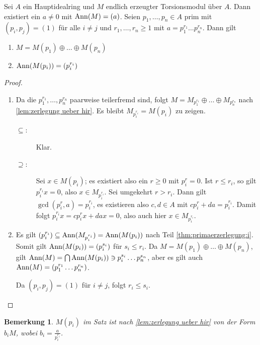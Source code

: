 \documentclass[12pt,a4paper]{scrartcl}
\theoremstyle{cplain}
\theoremstyle{cdef}
\newtheorem{beme}[thmcounter]{Bemerkung}
\begin{document}
\begin{satz} \label{thm:primaerzerlegung}
	Sei $A$ ein Hauptidealring und $M$ endlich erzeugter Torsionsmodul über $A$. Dann existiert ein $a\neq 0$ mit $\operatorname{Ann}(M) = (a)$. Seien $p_1,\dots, p_n\in A$ prim mit $(p_i, p_j) = (1)$ für alle $i\neq j$ und $r_1,\dots, r_n\ge 1$ mit $ a = p_1^{r_1}\dots p_n^{r_n} $. Dann gilt
	\begin{enumerate}
		\item $M = M(p_1)\oplus\dots\oplus M(p_n)$ \label{thm:primaerzerlegung:i}
		\item $\operatorname{Ann}(M(p_i)) = (p_i^{r_i})$ \label{thm:primaerzerlegung:ii}
	\end{enumerate}
\end{satz}
\begin{proof}
	\leavevmode
	\begin{enumerate}[label=\ref{thm:primaerzerlegung:\roman*}]
		\item Da die $p_1^{r_1},\dots, p_n^{r_n}$ paarweise teilerfremd sind, folgt $M = M_{p_1^{r_1}}\oplus\dots \oplus M_{p_n^{r_n}}$ nach \cref{lem:zerlegung ueber hir}. Es bleibt $M_{p_i^{r_i}} = M(p_i)$ zu zeigen.
		\begin{description}
			\item[\glqq$\subseteq$\grqq :] Klar.
			\item[\glqq$\supseteq$\grqq :] Sei $x\in M(p_i)$; es existiert also ein $r\ge 0$ mit $p_i^r = 0$. Ist $r \le r_i$, so gilt $p_i^{r_i}x = 0$, also $x \in M_{p_i^{r_i}}$. Sei umgekehrt $r>r_i$. Dann gilt $\gcd(p_i^r, a) = p_i^{r_i}$, es existieren also $c, d\in A$ mit $cp_i^r+da = p_i^{r_i}$. Damit folgt $p_i^{r_i}x = cp_i^rx+dax = 0$, also auch hier $x \in M_{p_i^{r_i}}$.
		\end{description}
		\item Es gilt $(p_i^{r_i})\subseteq \operatorname{Ann}(M_{p_i^{r_i}}) = \operatorname{Ann}(M(p_i))$ nach Teil \ref{thm:primaerzerlegung:i}. Somit gilt $\operatorname{Ann}(M(p_i)) = (p_i^{s_i})$ für $s_i\le r_i$. Da $M = M(p_1)\oplus \dots \oplus M(p_n)$, gilt $\operatorname{Ann}(M) = \bigcap \operatorname{Ann}(M(p_i))\ni p_i^{s_i}\dots p_n^{s_n}$, aber es gilt auch $\operatorname{Ann}(M) = (p_1^{r_1}\dots p_n^{r_n})$.
		
		Da $(p_i, p_j) = (1)$ für $i\neq j$, folgt $r_i\le s_i$.
		\qedhere
	\end{enumerate}
\end{proof}

\begin{beme}
	$M(p_i)$ im Satz ist nach \cref{lem:zerlegung ueber hir} von der Form $b_iM$, wobei $b_i = \frac{a}{p_i^{r_i}}$.
\end{beme}
\end{document}
